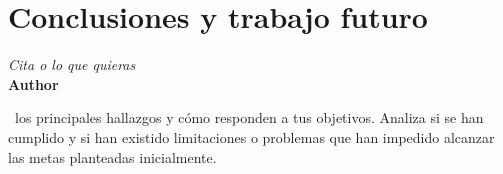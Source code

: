 \chapter{Conclusiones y trabajo futuro}
\label{cap:conclusiones}

\vspace{-0.5cm}

\begin{flushright}
  \emph{\guillemotleft Cita o lo que quieras\guillemotright}\\ \textbf{Author}
\end{flushright}
\hyphenation{}
\grayMinitoc

\parindent=16mm

~los principales hallazgos y cómo responden a tus objetivos. Analiza si se han cumplido y si han existido limitaciones o problemas que han impedido alcanzar las metas planteadas inicialmente.


